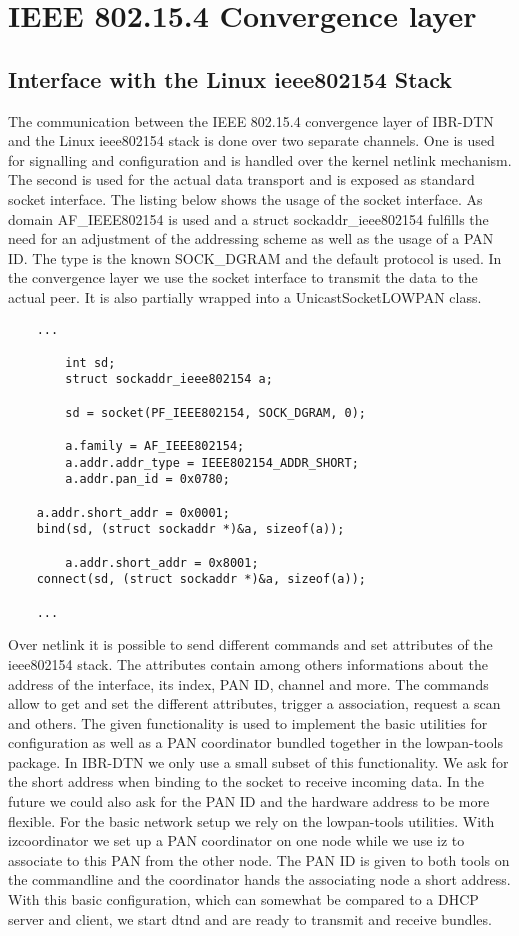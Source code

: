 \chapter{IEEE 802.15.4 Convergence layer}
\label{802154layer}
\section{Interface with the Linux ieee802154 Stack}

The communication between the IEEE 802.15.4 convergence layer of IBR-DTN and the
Linux ieee802154 stack is done over two separate channels. One is used for
signalling and configuration and is handled over the kernel netlink mechanism.
The second is used for the actual data transport and is exposed as standard
socket interface. The listing below shows the usage of the socket interface. As
domain AF\_IEEE802154 is used and a struct sockaddr\_ieee802154 fulfills the
need for an adjustment of the addressing scheme as well as the usage of a PAN
ID. The type is the known SOCK\_DGRAM and the default protocol is used. In the
convergence layer we use the socket interface to transmit the data to the actual
peer. It is also partially wrapped into a UnicastSocketLOWPAN class.

\begin{lstlisting}
	...

        int sd;
        struct sockaddr_ieee802154 a;

        sd = socket(PF_IEEE802154, SOCK_DGRAM, 0);

        a.family = AF_IEEE802154;
        a.addr.addr_type = IEEE802154_ADDR_SHORT;
        a.addr.pan_id = 0x0780;

	a.addr.short_addr = 0x0001;
	bind(sd, (struct sockaddr *)&a, sizeof(a));

        a.addr.short_addr = 0x8001;
	connect(sd, (struct sockaddr *)&a, sizeof(a));

	...
\end{lstlisting}

Over netlink it is possible to send different commands and set attributes of the
ieee802154 stack. The attributes contain among others informations about the
address of the interface, its index, PAN ID, channel and more. The commands
allow to get and set the different attributes, trigger a association, request a
scan and others. The given functionality is used to implement the basic
utilities for configuration as well as a PAN coordinator bundled together in
the lowpan-tools package. In IBR-DTN we only use a small subset of this
functionality. We ask for the short address when binding to the socket to
receive incoming data. In the future we could also ask for the PAN ID and the
hardware address to be more flexible. For the basic network setup we rely on the
lowpan-tools utilities. With izcoordinator we set up a PAN coordinator on one
node while we use iz to associate to this PAN from the other node. The PAN ID is
given to both tools on the commandline and the coordinator hands the
associating node a short address. With this basic configuration, which can
somewhat be compared to a DHCP server and client, we start dtnd and are ready to
transmit and receive bundles.

